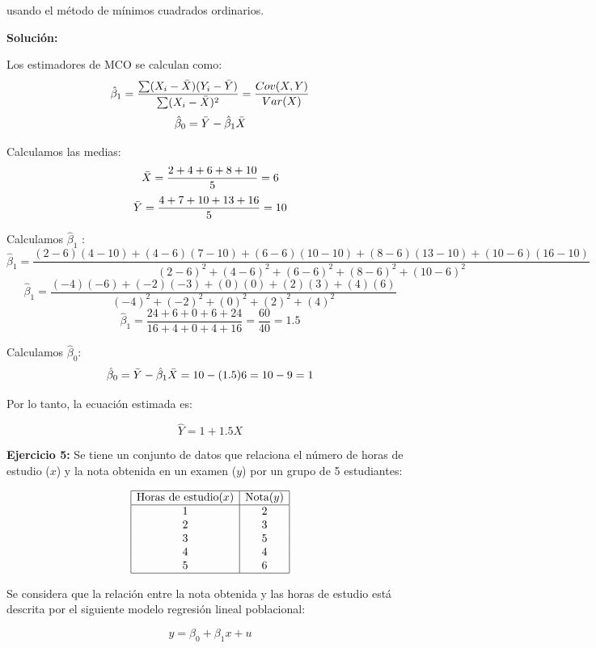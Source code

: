 \documentclass[10pt,a4paper]{article}
\begin{document}
usando el método de mínimos cuadrados ordinarios.

{\color{red} \textbf{Solución:}

Los estimadores de MCO se calculan como:
$$\hat{\beta}_1 = \frac{\sum (X_i - \Bar{X})(Y_i - \Bar{Y})}{\sum (X_i - \Bar{X})^2} = \frac{Cov(X,Y)}{Var(X)} $$
$$\hat{\beta}_0  = \Bar{Y} - \hat{\beta}_1 \Bar{X}$$

Calculamos las medias:
$$\Bar{X} = \frac{2+4+6+8+10}{5}=6$$ 
$$\Bar{Y} = \frac{4+7+10+13+16}{5} = 10$$

Calculamos $\hat{\beta}_1$ :
$$\hat{\beta}_1 = \frac{(2-6)(4-10)+(4-6)(7-10)+(6-6)(10-10)+(8-6)(13-10) + (10-6)(16-10)}{(2-6)^2+(4-6)^2+(6-6)^2+(8-6)^2+(10-6)^2}$$
$$\hat{\beta}_1 = \frac{(-4)(-6)+(-2)(-3)+(0)(0)+(2)(3)+(4)(6)}{(-4)^2+(-2)^2+(0)^2+(2)^2+(4)^2}$$
$$\hat{\beta}_1 = \frac{24+6+0+6+24}{16+4+0+4+16}= \frac{60}{40} = 1.5$$

Calculamos $\hat{\beta}_0$:
$$\hat{\beta}_0 = \Bar{Y} - \hat{\beta}_1 \Bar{X} = 10-(1.5)6 = 10 -9 = 1$$

Por lo tanto, la ecuación estimada es:

$$\hat{Y} = 1+1.5X$$}




\vspace{0.5cm}


\textbf{Ejercicio 5:} 
Se tiene un conjunto de datos que relaciona el número de horas de estudio (\(x\)) y la nota obtenida en un examen (\(y\)) por un grupo de 5 estudiantes:

\[
\begin{array}{|c|c|}
\hline
\text{Horas de estudio} (x) & \text{Nota} (y) \\
\hline
1 & 2 \\
2 & 3 \\
3 & 5 \\
4 & 4 \\
5 & 6 \\
\hline
\end{array}
\]

Se considera que la relación entre la nota obtenida y las horas de estudio 
est\'a descrita por el siguiente modelo regresión lineal poblacional:

\[
y = \beta_0 + \beta_1 x+u
\]
\end{document}
